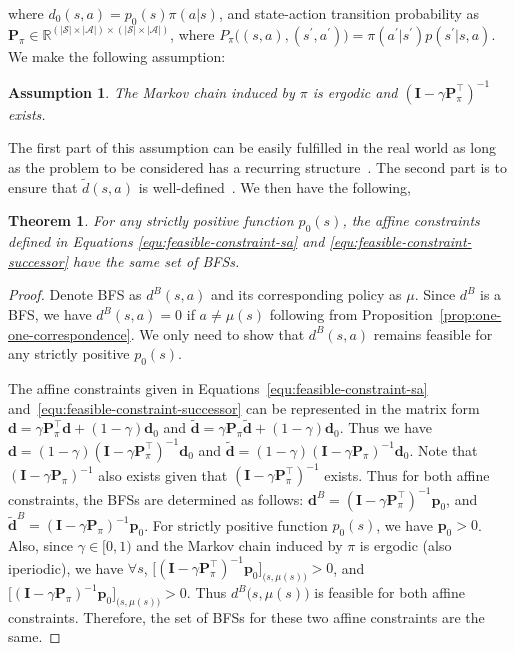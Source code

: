 \documentclass[letterpaper]{article} %
\newtheorem{theorem}{Theorem}
\newtheorem{assumption}{Assumption}
\newcommand{\m}[1]{\mathbf{#1}}
\begin{document}
where $d_0(s, a) = p_0(s)\pi(a|s)$,
and state-action transition probability as $\m{P}_{\pi}\in\mathbb{R}^{(|\mathcal{S}|\times|\mathcal{A}|)\times (|\mathcal{S}|\times|\mathcal{A}|)}$,
where $P_{\pi}\big( (s, a), (s^\prime, a^\prime)\big)=\pi(a^\prime|s^\prime)p(s^\prime|s, a)$.
We make the following assumption:
\begin{assumption}
The Markov chain induced by $\pi$ is ergodic and $(\m{I} - \gamma \m{P}_{\pi}^\top)^{-1}$ exists.
\end{assumption}
The first part of this assumption can be easily fulfilled in the real world as long as the problem to be considered has a recurring structure~\cite{levin2017markov}.
The second part is to ensure that $\tilde{d}(s, a)$ is well-defined~\cite{yu2015convergence}.
We then have the following,
\begin{theorem}\label{theo:bfs-invariant}
For any strictly positive function $p_0(s)$, the affine constraints defined in Equations \eqref{equ:feasible-constraint-sa} and \eqref{equ:feasible-constraint-successor} have the same set of BFSs.
\end{theorem}
\begin{proof}
Denote BFS as $d^B(s, a)$ and its corresponding policy as $\mu$.
Since $d^B$ is a BFS, we have $d^B(s, a)=0$ if $a\neq\mu(s)$ following from Proposition~\ref{prop:one-one-correspondence}.
We only need to show that $d^B(s, a)$ remains feasible for any strictly positive $p_0(s)$.

The affine constraints given in Equations~\eqref{equ:feasible-constraint-sa} and~\eqref{equ:feasible-constraint-successor} can be represented in the matrix form
$\m{d} = \gamma \m{P}_{\pi}^\top\m{d} + (1-\gamma) \m{d}_0$
and $\tilde{\m{d}} = \gamma \m{P}_{\pi}\tilde{\m{d}} + (1-\gamma) \m{d}_0$.
Thus we have $\m{d} = (1-\gamma) (\m{I} - \gamma \m{P}_{\pi}^\top)^{-1} \m{d}_0$
and $\tilde{\m{d}} = (1-\gamma) (\m{I} - \gamma \m{P}_{\pi})^{-1} \m{d}_0$.
Note that $(\m{I} - \gamma \m{P}_{\pi})^{-1}$ also exists given that $(\m{I} - \gamma \m{P}_{\pi}^\top)^{-1}$ exists.
Thus for both affine constraints, the BFSs are determined as follows:
$\m{d}^B = (\m{I} - \gamma \m{P}^\top_{\pi})^{-1} \m{p}_0$,
and $\tilde{\m{d}}^B = (\m{I} - \gamma \m{P}_{\pi})^{-1} \m{p}_0$.
For strictly positive function $p_0(s)$, we have $\m{p}_0 > 0$.
Also, since $\gamma\in [0, 1)$ and the Markov chain induced by $\pi$ is ergodic (also iperiodic),
we have $\forall s$, $\big[(\m{I} - \gamma \m{P}^\top_{\pi})^{-1} \m{p}_0 \big]_{\big(s,\mu(s)\big)} > 0$,
and $\big[(\m{I} - \gamma \m{P}_{\pi})^{-1} \m{p}_0 \big]_{\big(s,\mu(s)\big)} > 0$.
Thus $d^B\big(s, \mu(s) \big)$ is feasible for both affine constraints.
Therefore, the set of BFSs for these two affine constraints are the same.
\end{proof}
\end{document}
